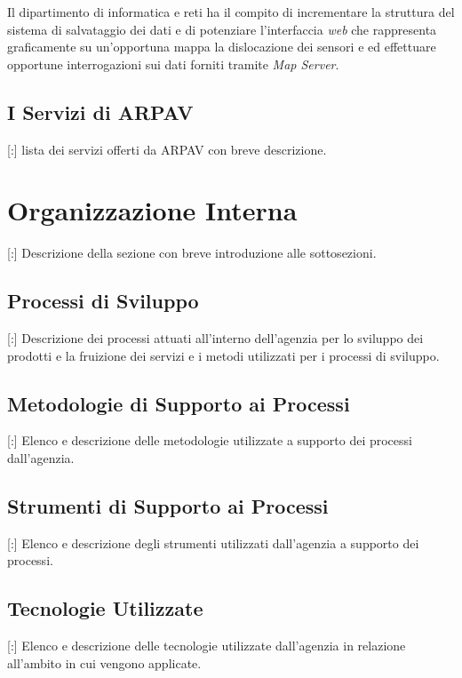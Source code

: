 Il dipartimento di informatica e reti ha il compito di incrementare la struttura del sistema di salvataggio dei dati e di potenziare l'interfaccia \textit{web} che rappresenta graficamente su un'opportuna mappa la dislocazione dei sensori e ed effettuare opportune interrogazioni sui dati forniti tramite \textit{Map Server}.

\subsection{I Servizi di ARPAV}

[:] lista dei servizi offerti da ARPAV con breve descrizione.

\section{Organizzazione Interna}

[:] Descrizione della sezione con breve introduzione alle sottosezioni.

\subsection{Processi di Sviluppo}

[:] Descrizione dei processi attuati all'interno dell'agenzia per lo sviluppo dei prodotti e la fruizione dei servizi e i metodi utilizzati per i processi di sviluppo.

\subsection{Metodologie di Supporto ai Processi}

[:] Elenco e descrizione delle metodologie utilizzate a supporto dei processi dall'agenzia.

\subsection{Strumenti di Supporto ai Processi}

[:] Elenco e descrizione degli strumenti utilizzati dall'agenzia a supporto dei processi.

\subsection{Tecnologie Utilizzate}

[:] Elenco e descrizione delle tecnologie utilizzate dall'agenzia in relazione all'ambito in cui vengono applicate.

